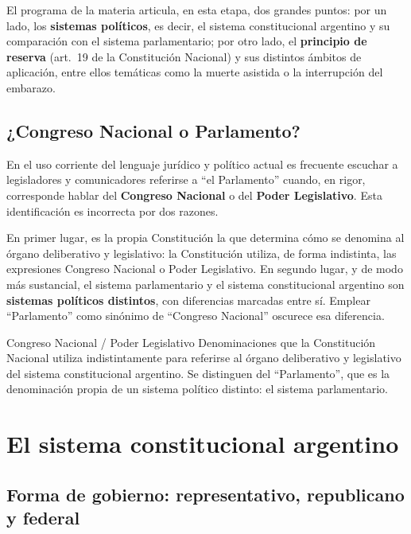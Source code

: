 \documentclass[12pt,oneside]{book}
\begin{document}
El programa de la materia articula, en esta etapa, dos grandes puntos: por un lado, los \textbf{sistemas políticos}, es decir, el sistema constitucional argentino y su comparación con el sistema parlamentario; por otro lado, el \textbf{principio de reserva} (art.\ 19 de la Constitución Nacional) y sus distintos ámbitos de aplicación, entre ellos temáticas como la muerte asistida o la interrupción del embarazo.

\section{¿Congreso Nacional o Parlamento?}

En el uso corriente del lenguaje jurídico y político actual es frecuente escuchar a legisladores y comunicadores referirse a ``el Parlamento'' cuando, en rigor, corresponde hablar del \textbf{Congreso Nacional} o del \textbf{Poder Legislativo}. Esta identificación es incorrecta por dos razones.

En primer lugar, es la propia Constitución la que determina cómo se denomina al órgano deliberativo y legislativo: la Constitución utiliza, de forma indistinta, las expresiones Congreso Nacional o Poder Legislativo. En segundo lugar, y de modo más sustancial, el sistema parlamentario y el sistema constitucional argentino son \textbf{sistemas políticos distintos}, con diferencias marcadas entre sí. Emplear ``Parlamento'' como sinónimo de ``Congreso Nacional'' oscurece esa diferencia.

\begin{definition}{Congreso Nacional / Poder Legislativo}
Denominaciones que la Constitución Nacional utiliza indistintamente para referirse al órgano deliberativo y legislativo del sistema constitucional argentino. Se distinguen del ``Parlamento'', que es la denominación propia de un sistema político distinto: el sistema parlamentario.
\end{definition}

\chapter{El sistema constitucional argentino}

\section{Forma de gobierno: representativo, republicano y federal}
\end{document}

